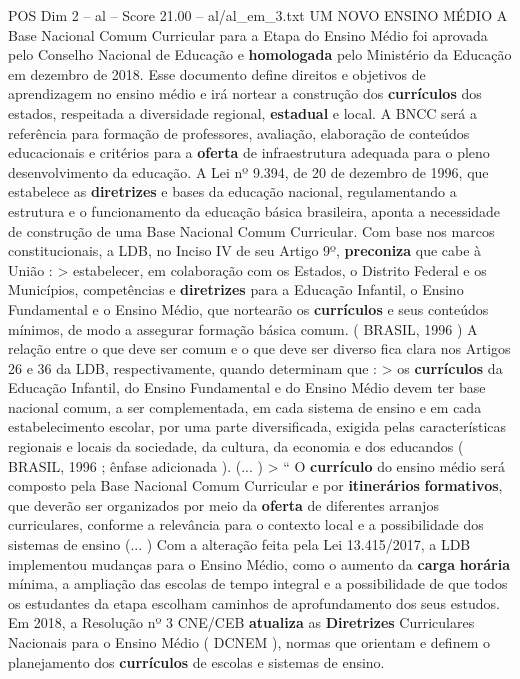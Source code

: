 \begin{textsample}{POS Dim 2 – al – Score 21.00 – al/al\_em\_3.txt}  \label{ex:f2_pos_268}
UM NOVO ENSINO MÉDIO A Base Nacional Comum Curricular para a Etapa do Ensino Médio foi aprovada pelo Conselho Nacional de Educação e \textbf{homologada} pelo Ministério da Educação em dezembro de 2018.
Esse documento define direitos e objetivos de aprendizagem no ensino médio e irá nortear a construção dos \textbf{currículos} dos estados, respeitada a diversidade regional, \textbf{estadual} e local.
A BNCC será a referência para formação de professores, avaliação, elaboração de conteúdos educacionais e critérios para a \textbf{oferta} de infraestrutura adequada para o pleno desenvolvimento da educação.
A Lei nº 9.394, de 20 de dezembro de 1996, que estabelece as \textbf{diretrizes} e bases da educação nacional, regulamentando a estrutura e o funcionamento da educação básica brasileira, aponta a necessidade de construção de uma Base Nacional Comum Curricular.
Com base nos marcos constitucionais, a LDB, no Inciso IV de seu Artigo 9º, \textbf{preconiza} que cabe à União : > estabelecer, em colaboração com os Estados, o Distrito Federal e os Municípios, competências e \textbf{diretrizes} para a Educação Infantil, o Ensino Fundamental e o Ensino Médio, que nortearão os \textbf{currículos} e seus conteúdos mínimos, de modo a assegurar formação básica comum. ( BRASIL, 1996 ) A relação entre o que deve ser comum e o que deve ser diverso fica clara nos Artigos 26 e 36 da LDB, respectivamente, quando determinam que : > os \textbf{currículos} da Educação Infantil, do Ensino Fundamental e do Ensino Médio devem ter base nacional comum, a ser complementada, em cada sistema de ensino e em cada estabelecimento escolar, por uma parte diversificada, exigida pelas características regionais e locais da sociedade, da cultura, da economia e dos educandos ( BRASIL, 1996 ; ênfase adicionada ). (... ) > “ O \textbf{currículo} do ensino médio será composto pela Base Nacional Comum Curricular e por \textbf{itinerários} \textbf{formativos}, que deverão ser organizados por meio da \textbf{oferta} de diferentes arranjos curriculares, conforme a relevância para o contexto local e a possibilidade dos sistemas de ensino (... ) Com a alteração feita pela Lei 13.415/2017, a LDB implementou mudanças para o Ensino Médio, como o aumento da \textbf{carga} \textbf{horária} mínima, a ampliação das escolas de tempo integral e a possibilidade de que todos os estudantes da etapa escolham caminhos de aprofundamento dos seus estudos.
Em 2018, a Resolução nº 3 CNE/CEB \textbf{atualiza} as \textbf{Diretrizes} Curriculares Nacionais para o Ensino Médio ( DCNEM ), normas que orientam e definem o planejamento dos \textbf{currículos} de escolas e sistemas de ensino.

\end{textsample}
